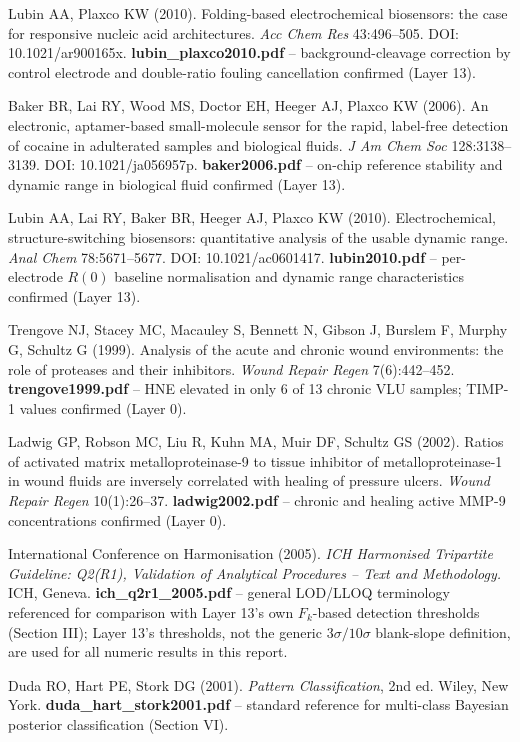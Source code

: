 \documentclass[11pt]{article}
\numberwithin{equation}{section}
\begin{document}
\begin{enumerate}[leftmargin=2.2em, itemsep=6pt, label={[\arabic*]}]
\item Lubin AA, Plaxco KW (2010). Folding-based electrochemical biosensors: the case for responsive nucleic
acid architectures. \textit{Acc Chem Res} 43:496--505. DOI: 10.1021/ar900165x.
\textbf{lubin\_plaxco2010.pdf} -- background-cleavage correction by control electrode and double-ratio fouling
cancellation confirmed (Layer 13).

\item Baker BR, Lai RY, Wood MS, Doctor EH, Heeger AJ, Plaxco KW (2006). An electronic, aptamer-based
small-molecule sensor for the rapid, label-free detection of cocaine in adulterated samples and biological
fluids. \textit{J Am Chem Soc} 128:3138--3139. DOI: 10.1021/ja056957p. \textbf{baker2006.pdf} -- on-chip
reference stability and dynamic range in biological fluid confirmed (Layer 13).

\item Lubin AA, Lai RY, Baker BR, Heeger AJ, Plaxco KW (2010). Electrochemical, structure-switching
biosensors: quantitative analysis of the usable dynamic range. \textit{Anal Chem} 78:5671--5677. DOI:
10.1021/ac0601417. \textbf{lubin2010.pdf} -- per-electrode $R(0)$ baseline normalisation and dynamic range
characteristics confirmed (Layer 13).

\item Trengove NJ, Stacey MC, Macauley S, Bennett N, Gibson J, Burslem F, Murphy G, Schultz G (1999). Analysis
of the acute and chronic wound environments: the role of proteases and their inhibitors. \textit{Wound Repair
Regen} 7(6):442--452. \textbf{trengove1999.pdf} -- HNE elevated in only 6 of 13 chronic VLU samples; TIMP-1
values confirmed (Layer 0).

\item Ladwig GP, Robson MC, Liu R, Kuhn MA, Muir DF, Schultz GS (2002). Ratios of activated matrix
metalloproteinase-9 to tissue inhibitor of metalloproteinase-1 in wound fluids are inversely correlated with
healing of pressure ulcers. \textit{Wound Repair Regen} 10(1):26--37. \textbf{ladwig2002.pdf} -- chronic and
healing active MMP-9 concentrations confirmed (Layer 0).

\item International Conference on Harmonisation (2005). \textit{ICH Harmonised Tripartite Guideline: Q2(R1),
Validation of Analytical Procedures -- Text and Methodology.} ICH, Geneva. \textbf{ich\_q2r1\_2005.pdf} --
general LOD/LLOQ terminology referenced for comparison with Layer 13's own $F_k$-based detection thresholds
(Section III); Layer 13's thresholds, not the generic $3\sigma/10\sigma$ blank-slope definition, are used for
all numeric results in this report.

\item Duda RO, Hart PE, Stork DG (2001). \textit{Pattern Classification}, 2nd ed. Wiley, New York.
\textbf{duda\_hart\_stork2001.pdf} -- standard reference for multi-class Bayesian posterior classification
(Section VI).

\end{enumerate}
\end{document}
